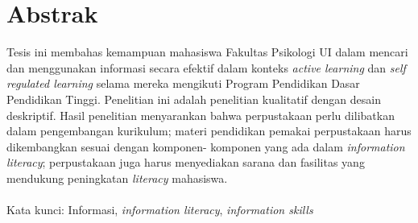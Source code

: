 %
%
%

\chapter*{Abstrak}



\begin{singlespace} %
{

	Tesis ini membahas kemampuan mahasiswa Fakultas Psikologi UI dalam mencari dan
	menggunakan informasi secara efektif dalam konteks \textit{active learning} dan \textit{self regulated
	learning} selama mereka mengikuti Program Pendidikan Dasar Pendidikan Tinggi.
	Penelitian ini adalah penelitian kualitatif dengan desain deskriptif. Hasil penelitian
	menyarankan bahwa perpustakaan perlu dilibatkan dalam pengembangan kurikulum;
	materi pendidikan pemakai perpustakaan harus dikembangkan sesuai dengan komponen-
	komponen yang ada dalam \textit{information literacy}; perpustakaan juga harus menyediakan
	sarana dan fasilitas yang mendukung peningkatan \textit{literacy} mahasiswa. \\ \\
    Kata kunci:
	Informasi, \textit{information literacy}, \textit{information skills}
}
\end{singlespace}
